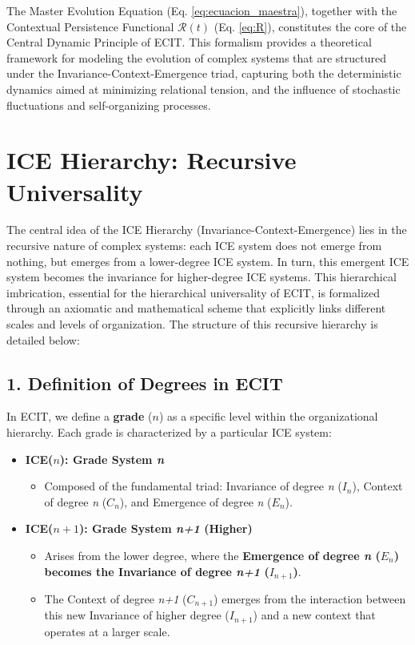 \documentclass{article}
\begin{document}
The Master Evolution Equation (Eq. \ref{eq:ecuacion_maestra}), together with the Contextual Persistence Functional $\mathcal{R}(t)$ (Eq. \ref{eq:R}), constitutes the core of the Central Dynamic Principle of ECIT. This formalism provides a theoretical framework for modeling the evolution of complex systems that are structured under the Invariance-Context-Emergence triad, capturing both the deterministic dynamics aimed at minimizing relational tension, and the influence of stochastic fluctuations and self-organizing processes.

\section{ICE Hierarchy: Recursive Universality}

The central idea of the ICE Hierarchy (Invariance-Context-Emergence) lies in the recursive nature of complex systems: each ICE system does not emerge from nothing, but emerges from a lower-degree ICE system. In turn, this emergent ICE system becomes the invariance for higher-degree ICE systems. This hierarchical imbrication, essential for the hierarchical universality of ECIT, is formalized through an axiomatic and mathematical scheme that explicitly links different scales and levels of organization. The structure of this recursive hierarchy is detailed below:

\subsection{1. Definition of Degrees in ECIT}
In ECIT, we define a \textbf{grade} ($n$) as a specific level within the organizational hierarchy. Each grade is characterized by a particular ICE system:
\begin{itemize}
    \item \textbf{ICE($n$): Grade System \textit{n}}
    \begin{itemize}
        \item Composed of the fundamental triad: Invariance of degree \textit{n} ($I_n$), Context of degree \textit{n} ($C_n$), and Emergence of degree \textit{n} ($E_n$).    \end{itemize}
    \item \textbf{ICE($n+1$): Grade System \textit{n+1} (Higher)}
    \begin{itemize}
        \item Arises from the lower degree, where the \textbf{Emergence of degree \textit{n} ($E_n$) becomes the Invariance of degree \textit{n+1} ($I_{n+1}$)}.     
        \item The Context of degree \textit{n+1} ($C_{n+1}$) emerges from the interaction between this new Invariance of higher degree ($I_{n+1}$) and a new context that operates at a larger scale.
    \end{itemize}
\end{itemize}
\end{document}

